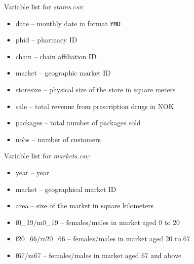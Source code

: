 \documentclass[12pt,a4paper]{article}
\begin{document}
\vspace{10pt}
Variable list for \emph{stores.csv}:
\begin{itemize}
 \item date -- monthly date in format \texttt{YMD}
 \item phid -- pharmacy ID
 \item chain -- chain affiliation ID
 \item market -- geographic market ID
 \item storesize -- physical size of the store in square meters
 \item sale -- total revenue from prescription drugs in NOK
 \item packages -- total number of packages sold
 \item nobs -- number of customers
\end{itemize}

\vspace{10pt}
Variable list for \emph{markets.csv}:
\begin{itemize}
 \item year -- year
 \item market -- geographical market ID
 \item area -- size of the market in square kilometers
 \item f0\_19/m0\_19 -- females/males in market aged 0 to 20
 \item f20\_66/m20\_66 -- females/males in market aged 20 to 67
 \item f67/m67 -- females/males in market aged 67 and above
\end{itemize}

\pagebreak
\end{document}
